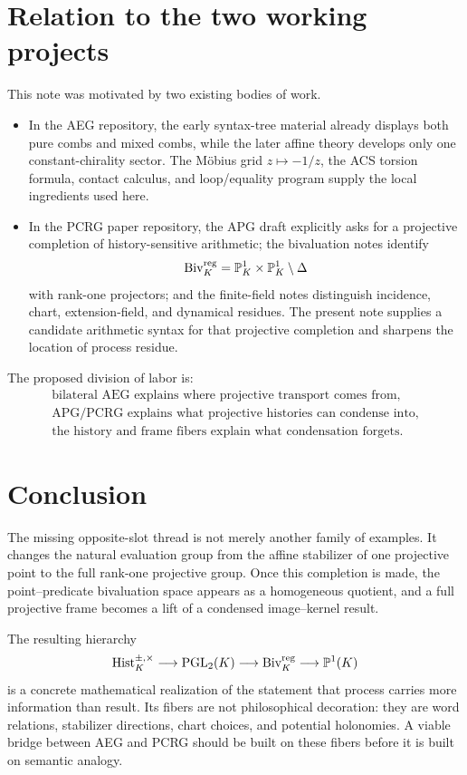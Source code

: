 \documentclass[11pt]{article}
\theoremstyle{definition}
\theoremstyle{remark}
\newcommand{\PGL}{\operatorname{PGL}}
\newcommand{\Biv}{\operatorname{Biv}}
\newcommand{\Hist}{\operatorname{Hist}}
\newcommand{\PP}{\mathbb P}
\begin{document}
\section{Relation to the two working projects}

This note was motivated by two existing bodies of work.

\begin{itemize}
  \item In the AEG repository, the early syntax-tree material already displays
  both pure combs and mixed combs, while the later affine theory develops only
  one constant-chirality sector.  The Möbius grid \(z\mapsto-1/z\), the ACS
  torsion formula, contact calculus, and loop/equality program supply the
  local ingredients used here.

  \item In the PCRG paper repository, the APG draft explicitly asks for a
  projective completion of history-sensitive arithmetic; the bivaluation notes
  identify
  \[
  \Biv_K^{\rm reg}
  =\PP^1_K\times\PP^1_K\setminus\Delta
  \]
  with rank-one projectors; and the finite-field notes distinguish incidence,
  chart, extension-field, and dynamical residues.  The present note supplies
  a candidate arithmetic syntax for that projective completion and sharpens
  the location of process residue.
\end{itemize}

The proposed division of labor is:
\[
\boxed{
\begin{array}{c}
\text{bilateral AEG explains where projective transport comes from},\\[1mm]
\text{APG/PCRG explains what projective histories can condense into},\\[1mm]
\text{the history and frame fibers explain what condensation forgets}.
\end{array}}
\]

\section{Conclusion}

The missing opposite-slot thread is not merely another family of examples.
It changes the natural evaluation group from the affine stabilizer of one
projective point to the full rank-one projective group.  Once this completion
is made, the point--predicate bivaluation space appears as a homogeneous
quotient, and a full projective frame becomes a lift of a condensed
image--kernel result.

The resulting hierarchy
\[
\Hist_K^{\pm,\times}
\longrightarrow
\PGL_2(K)
\longrightarrow
\Biv_K^{\rm reg}
\longrightarrow
\PP^1(K)
\]
is a concrete mathematical realization of the statement that process carries
more information than result.  Its fibers are not philosophical decoration:
they are word relations, stabilizer directions, chart choices, and potential
holonomies.  A viable bridge between AEG and PCRG should be built on these
fibers before it is built on semantic analogy.
\end{document}
